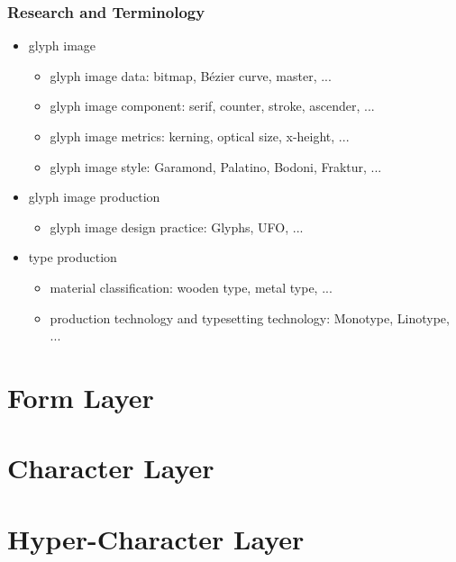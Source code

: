 \documentclass{beamer}
\begin{document}
	\begin{frame}
		\frametitle{Research and Terminology}

		\begin{itemize}
			\item glyph image
			\begin{itemize}
                \item glyph image data: bitmap, Bézier curve, master, ...
				\item glyph image component: serif, counter, stroke, ascender, ...
				\item glyph image metrics: kerning, optical size, x-height, ...
				\item glyph image style: Garamond, Palatino, Bodoni, Fraktur, ...
			\end{itemize}
			\item glyph image production
			\begin{itemize}
                \item glyph image design practice: Glyphs, UFO, ...
            \end{itemize}
            \item type production
			\begin{itemize}
                \item material classification: wooden type, metal type, ...
                \item production technology and typesetting technology: Monotype, Linotype, ...
            \end{itemize}
		\end{itemize}
	\end{frame}

    \section{Form Layer}

	\begin{frame}
	\end{frame}
	
	\begin{frame}
	\end{frame}

    \section{Character Layer}

	\begin{frame}
	\end{frame}
	
	\begin{frame}
	\end{frame}

    \section{Hyper-Character Layer}

	\begin{frame}
	\end{frame}
\end{document}
